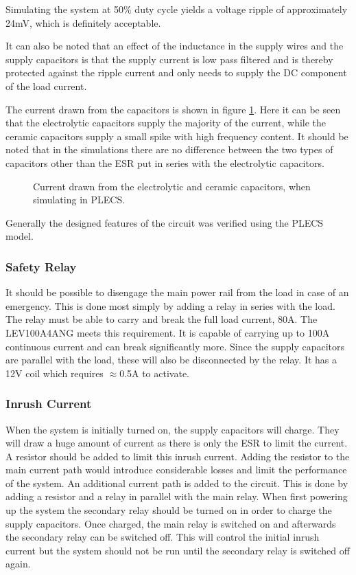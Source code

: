 Simulating the system at 50\% duty cycle yields a voltage ripple of approximately 24mV, which is definitely acceptable. 

It can also be noted that an effect of the inductance in the supply wires and the supply capacitors is that the supply current is low pass filtered and is thereby protected against the ripple current and only needs to supply the DC component of the load current.

The current drawn from the capacitors is shown in figure \ref{fig:cap_currents}.
Here it can be seen that the electrolytic capacitors supply the majority of the current, while the ceramic capacitors supply a small spike with high frequency content.
It should be noted that in the simulations there are no difference between the two types of capacitors other than the ESR put in series with the electrolytic capacitors. 

\begin{figure}[h]
	\centering
    
	\caption{Current drawn from the electrolytic and ceramic capacitors, when simulating in PLECS. }
	\label{fig:cap_currents}
\end{figure}

Generally the designed features of the circuit was verified using the PLECS model.

\subsubsection{Safety Relay} %
\label{ssub:safety_relay}
It should be possible to disengage the main power rail from the load in case of an emergency.
This is done most simply by adding a relay in series with the load.
The relay must be able to carry and break the full load current, 80A.
The LEV100A4ANG meets this requirement. 
It is capable of carrying up to 100A continuous current and can break significantly more.
Since the supply capacitors are parallel with the load, these will also be disconnected by the relay.
It has a 12V coil which requires $\approx$0.5A to activate.

\subsubsection{Inrush Current}
\label{ssub:inrush_current}
When the system is initially turned on, the supply capacitors will charge.
They will draw a huge amount of current as there is only the ESR to limit the current. 
A resistor should be added to limit this inrush current. 
Adding the resistor to the main current path would introduce considerable losses and limit the performance of the system.
An additional current path is added to the circuit.
This is done by adding a resistor and a relay in parallel with the main relay.
When first powering up the system the secondary relay should be turned on in order to charge the supply capacitors.
Once charged, the main relay is switched on and afterwards the secondary relay can be switched off.
This will control the initial inrush current but the system should not be run until the secondary relay is switched off again.

